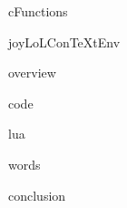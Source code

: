
\usemodule[t-diSimp]

\startDiSimpComponent cFunctions

\diSimpEnvironment joyLoLConTeXtEnv

\startJoyLoLCoAlg[title=C-Functions][cFunctions]

\diSimpComponent overview

\diSimpComponent code

\diSimpComponent lua

\diSimpComponent words

\diSimpComponent conclusion

\stopJoyLoLCoAlg

\stopDiSimpComponent
